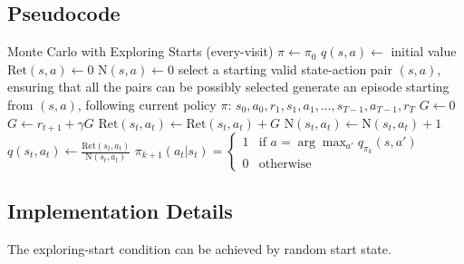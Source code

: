     \subsection{Pseudocode}
        {Monte Carlo with Exploring Starts (every-visit)}
        {
        }
        {
        }
        {
            {
                $\pi \leftarrow \pi_0$\;
                $q(s,a) \leftarrow$ initial value\;
                $\text{Ret}(s,a) \leftarrow 0$\;
                $\text{N}(s,a) \leftarrow 0$\;
            }
            {
                select a starting valid state-action pair $(s,a)$, ensuring that all the pairs can be possibly selected\;
                generate an episode starting from $(s,a)$, following current policy $\pi$: $s_0, a_0, r_1, s_1, a_1, \dots, s_{T-1}, a_{T-1}, r_T$\;
                $G \leftarrow 0$\;
                {
                    $G \leftarrow r_{t+1} + \gamma G$\;
                    $\text{Ret}(s_t,a_t) \leftarrow \text{Ret}(s_t,a_t) + G$\;
                    $\text{N}(s_t,a_t) \leftarrow \text{N}(s_t,a_t) + 1$\;
                    $q(s_t,a_t) \leftarrow \frac{\text{Ret}(s_t,a_t)}{\text{N}(s_t,a_t)}$\;
                    $\pi_{k+1}(a_t|s_t) = \begin{cases}
                        1 &\text{if $a=\arg\max_{a'}{q_{\pi_k}(s,a')}$} \\
                        0 &\text{otherwise}
                    \end{cases}$\;
                }
            }
        }
        
    \subsection{Implementation Details}
        The exploring-start condition can be achieved by random start state.

